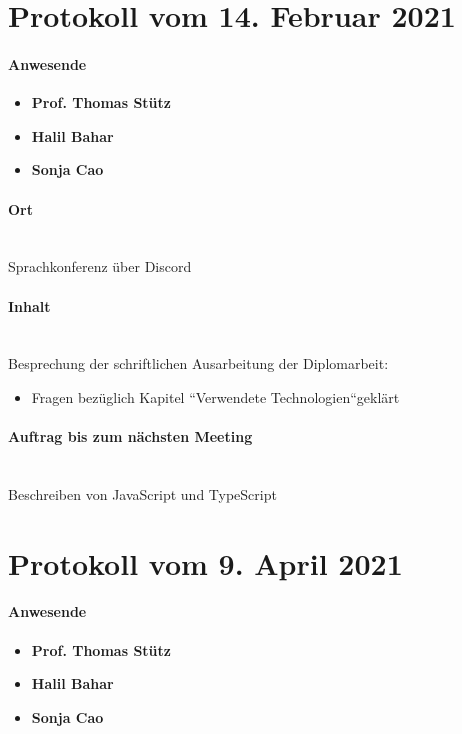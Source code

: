 \section{Protokoll vom 14. Februar 2021}

\paragraph{Anwesende}
\begin{itemize}
	\item{\textbf{Prof. Thomas Stütz}}
	\item{\textbf{Halil Bahar}}
	\item{\textbf{Sonja Cao}}
\end{itemize}

\paragraph{Ort}\mbox{}\\
Sprachkonferenz über Discord

\paragraph{Inhalt}\mbox{}\\
Besprechung der schriftlichen Ausarbeitung der Diplomarbeit:
\begin{itemize}
	\item Fragen bezüglich Kapitel ``Verwendete Technologien``geklärt
\end{itemize}

\paragraph{Auftrag bis zum nächsten Meeting}\mbox{}\\
Beschreiben von JavaScript und TypeScript

\section{Protokoll vom 9. April 2021}

\paragraph{Anwesende}
\begin{itemize}
	\item{\textbf{Prof. Thomas Stütz}}
	\item{\textbf{Halil Bahar}}
	\item{\textbf{Sonja Cao}}
\end{itemize}

